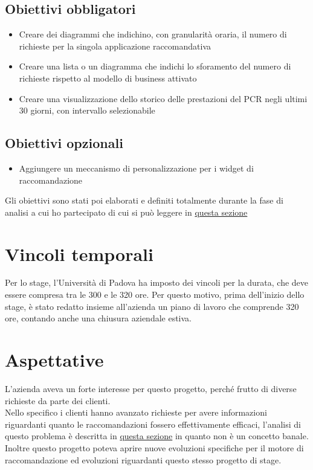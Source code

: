 \documentclass[a4paper, 12pt, twoside, openright]{book}
\begin{document}
\subsection{Obiettivi obbligatori}
\begin{itemize}
\item Creare dei diagrammi che indichino, con granularità oraria, il numero di richieste per la singola applicazione raccomandativa
\item Creare una lista o un diagramma che indichi lo sforamento del numero di richieste rispetto al modello di business attivato
\item Creare una visualizzazione dello storico delle prestazioni del PCR negli ultimi 30 giorni, con intervallo selezionabile
\end{itemize}

\subsection{Obiettivi opzionali}
\begin{itemize}
\item Aggiungere un meccanismo di personalizzazione per i widget di raccomandazione
\end{itemize}

Gli obiettivi sono stati poi elaborati e definiti totalmente durante la fase di analisi a cui ho partecipato di cui si può leggere in \hyperref[analisi]{questa sezione}

\section{Vincoli temporali}
Per lo stage, l'Università di Padova ha imposto dei vincoli per la durata, che deve essere compresa tra le 300 e le 320 ore. Per questo motivo, prima dell'inizio dello stage, è stato redatto insieme all'azienda un piano di lavoro che comprende 320 ore, contando anche una chiusura aziendale estiva.

\section{Aspettative}
L'azienda aveva un forte interesse per questo progetto, perché frutto di diverse richieste da parte dei clienti.\\
Nello specifico i clienti hanno avanzato richieste per avere informazioni riguardanti quanto le raccomandazioni fossero effettivamente efficaci, l'analisi di questo problema è descritta in \hyperref[analisi-pcr]{questa sezione} in quanto non è un concetto banale.\\
Inoltre questo progetto poteva aprire nuove evoluzioni specifiche per il motore di raccomandazione ed evoluzioni riguardanti questo stesso progetto di stage.
\end{document}
